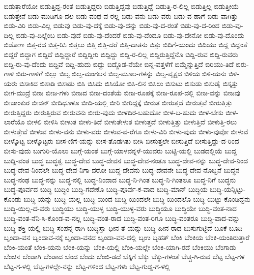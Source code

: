 ಬಿಡುತ್ತಾರೆಯೋ
ಬಿಡುತ್ತಿದ್ದ-ರಂತೆ
ಬಿಡುತ್ತಿದ್ದರು
ಬಿಡುತ್ತಿದ್ದವು
ಬಿಡುತ್ತಿದ್ದೆ
ಬಿಡುತ್ತಿ-ರ-ಲಿಲ್ಲ
ಬಿಡುತ್ತಿಲ್ಲ
ಬಿಡುತ್ತೀಯೆ
ಬಿಡುತ್ತೇನೆ
ಬಿಡು-ಮುಡಿಗೂ-ದಲ
ಬಿಡು-ವಂಥ-ವ-ರಲ್ಲ
ಬಿಡು-ವನು
ಬಿಡು-ವರು
ಬಿಡು-ವ-ಹಾಗೆ
ಬಿಡು-ವಾಗಿತ್ತು
ಬಿಡು-ವಿರಿ
ಬಿಡು-ವಿಲ್ಲ
ಬಿಡುವು
ಬಿಡು-ವು-ದಕ್ಕೆ
ಬಿಡು-ವು-ದನ್ನು
ಬಿಡು-ವು-ದ-ರಂತೆ
ಬಿಡು-ವು-ದ-ರಿಂದ
ಬಿಡು-ವು-ದಿಲ್ಲ
ಬಿಡು-ವು-ದಿಲ್ಲೆಂಬ
ಬಿಡು-ವುದೆ
ಬಿಡು-ವು-ದೆಂದರೆ
ಬಿಡು-ವು-ದೆಂದೂ
ಬಿಡು-ವು-ದೇನೋ
ಬಿಡು-ವು-ದೊಂದು
ಬಿಡೋಣ
ಬಿತ್ತ-ರದ
ಬಿತ್ತ-ರಿಸಿ
ಬಿತ್ತಲು
ಬಿತ್ತಿ
ಬಿತ್ತಿ-ದರೆ
ಬಿತ್ತಿ-ದಾತನು
ಬಿತ್ತು
ಬಿದಿಗೆ-ಯಂದು
ಬಿದಿಯು
ಬಿದ್ದ
ಬಿದ್ದಂತೆ
ಬಿದ್ದರೆ
ಬಿದ್ದಾಗ
ಬಿದ್ದಿದೆ
ಬಿದ್ದಿದ್ದಾರೆ
ಬಿದ್ದಿದ್ದೀರಿ
ಬಿದ್ದಿದ್ದು
ಬಿದ್ದಿ-ರ-ಲಿಲ್ಲ
ಬಿದ್ದಿರುತ್ತಿದ್ದೆನೊ
ಬಿದ್ದಿ-ರುವ
ಬಿದ್ದಿ-ರುವರು
ಬಿದ್ದಿ-ರು-ವು-ದೆಂದು
ಬಿದ್ದಿವೆ
ಬಿದ್ದಿ-ಹುದು
ಬಿದ್ದು
ಬಿದ್ದೊಡ-ನೆಯೇ
ಬಿನ್ನ-ವತ್ತಳೆಗೆ
ಬಿಮ್ಮೆನ್ನುತ್ತಿದೆ
ಬಿರಿಯು-ತಿದೆ
ಬಿರು-ಗಾಳಿ
ಬಿರು-ಗಾಳಿಗೆ
ಬಿಲ್ಲು
ಬಿಲ್ವ
ಬಿಲ್ವ-ಮಂಗಲನ
ಬಿಲ್ವ-ಮೂಲ-ಗಳನ್ನು
ಬಿಲ್ವ-ವೃಕ್ಷದ
ಬಿಳಿಯ
ಬಿಳಿ-ಯನು
ಬಿಳಿ-ಯರು
ಬಿಸಾಕಿದ
ಬಿಸಾಡಿ
ಬಿಸಾಡು
ಬಿಸಿ
ಬಿಸಿದು
ಬಿಸಿಯೋ
ಬಿಸಿ-ಲಿನ
ಬಿಸಿಲು
ಬಿಸುಟು
ಬಿಸುಡು
ಬಿಸುಡೈ
ಬಿಸ್ಕತ್ತು
ಬೀಗ-ಮುದ್ರೆ
ಬೀಜ
ಬೀಜ-ಗಳು
ಬೀಜದ
ಬೀಜ-ದಂತೆಯೆ
ಬೀಜ-ರೂಪಕ್ಕೆ
ಬೀಜ-ರೂಪ-ದಲ್ಲಿ
ಬೀಜ-ವನ್ನು
ಬೀಜವು
ಬೀಜಾಂಕುರ
ಬೀಡನ್
ಬೀದಿಧೂಳೂ
ಬೀದಿ-ಯಲ್ಲಿ
ಬೀರಿ
ಬೀರಿದ್ದಕ್ಕೆ
ಬೀರುತ
ಬೀರುತ್ತದೆ
ಬೀರುತ್ತವೆ
ಬೀರುತ್ತಿತ್ತು
ಬೀರುತ್ತಿದ್ದರು
ಬೀರುತ್ತಿರುವ
ಬೀರುವನು
ಬೀರು-ವುದು
ಬೀಳದಿರ-ಬಹುದೋ
ಬೀಳ-ಬ-ಹುದು
ಬೀಳ-ಬೇಕು
ಬೀಳ-ಲಾರೆಯೊ
ಬೀಳಲಿ
ಬೀಳಿಸಿ
ಬೀಳುತ
ಬೀಳು-ತಿದೆ
ಬೀಳುತೇಳುತ
ಬೀಳುತ್ತದೆ
ಬೀಳುತ್ತಿತ್ತು
ಬೀಳುತ್ತಿದೆ
ಬೀಳುತ್ತಿ-ರಲು
ಬೀಳುತ್ತೇವೆ
ಬೀಳುವ
ಬೀಳು-ವನು
ಬೀಳು-ವರು
ಬೀಳುವ-ವ-ರೆಗೂ
ಬೀಳು-ವಿರಿ
ಬೀಳು-ವುದು
ಬೀಳು-ವುವೋ
ಬೀಳುವೆ
ಬೀಳ್ಕೊಟ್ಟ
ಬೀಳ್ಕೊಟ್ಟರು
ಬೀಸ-ಣಿಗೆ-ಯನ್ನು
ಬೀಸ-ತೊಡಗಿತು
ಬೀಸಿ
ಬೀಸುತ್ತಲೇ
ಬೀಸುತ್ತಿದೆ
ಬೀಸುತ್ತಿದ್ದು-ದ-ರಿಂದ
ಬೀಸು-ವುದು
ಬುಗುರಿ-ಯೊಲು
ಬುಗ್ಗೆ-ಯಂತೆ
ಬುಗ್ಗೆ-ಯಾಳವನ್ನಳೆ-ಯುವರು
ಬುಟ್ಟಿ-ಯಲ್ಲಿ
ಬುಡದಲ್ಲಿಯೆ
ಬುದ್ದ
ಬುದ್ದಿ-ವಂತ
ಬುದ್ಧ
ಬುದ್ಧತ್ವ
ಬುದ್ಧ-ದೇವ
ಬುದ್ಧ-ದೇವನ
ಬುದ್ಧ-ದೇವ-ನಂತೂ
ಬುದ್ಧ-ದೇವ-ನನ್ನು
ಬುದ್ಧ-ದೇವ-ನಿಂದ
ಬುದ್ಧ-ದೇವ-ನಿಂದಲೇ
ಬುದ್ಧ-ದೇವ-ನಿಗಾ-ದರೋ
ಬುದ್ಧ-ದೇವನು
ಬುದ್ಧ-ದೇವನೇ
ಬುದ್ಧ-ದೇವ-ನೊಬ್ಬನೆ
ಬುದ್ಧನ
ಬುದ್ಧ-ನಂಥ
ಬುದ್ಧ-ನನ್ನು
ಬುದ್ಧ-ನಲ್ಲಿ
ಬುದ್ಧ-ನಿಂದಾದ
ಬುದ್ಧ-ನಿ-ಗಿಂತ
ಬುದ್ಧ-ನಿ-ಗಿಂತಲೂ
ಬುದ್ಧ-ನಿಗೆ
ಬುದ್ಧನು
ಬುದ್ಧ-ಪೂರ್ವದ
ಬುದ್ಧಿ
ಬುದ್ಧಿಂ
ಬುದ್ಧಿ-ಗದೇಕೊ
ಬುದ್ಧಿ-ಪೂರ್ವ-ಕ-ವಾದ
ಬುದ್ಧಿ-ಮಾನ್
ಬುದ್ಧಿಯ
ಬುದ್ಧಿ-ಯನ್ನಿಟ್ಟು-ಕೊಂಡು
ಬುದ್ಧಿ-ಯನ್ನು
ಬುದ್ಧಿ-ಯಲ್ಲ
ಬುದ್ಧಿ-ಯಿಂದ
ಬುದ್ಧಿ-ಯಿಂದಲೇ
ಬುದ್ಧಿ-ಯಿಂದಲೊ
ಬುದ್ಧಿ-ಯಿಟ್ಟು-ಕೊಂಡಿದ್ದನು
ಬುದ್ಧಿ-ಯಿಲ್ಲ-ದ-ವರು
ಬುದ್ಧಿಯು
ಬುದ್ಧಿ-ಯುಳ್ಳ
ಬುದ್ಧಿ-ಯುಳ್ಳ-ವರು
ಬುದ್ಧಿಯೂ
ಬುದ್ಧಿಯೇ
ಬುದ್ಧಿ-ವಂತ-ನಾದ
ಬುದ್ಧಿ-ವಂತ-ನೆನಿ-ಸಿ-ಕೊಂಡ-ವ-ನಲ್ಲ
ಬುದ್ಧಿ-ವಂತ-ರಾದ
ಬುದ್ಧಿ-ವಂತ-ರಿಗೂ
ಬುದ್ಧಿ-ವಂತರೂ
ಬುದ್ಧಿ-ವಾದ-ವನ್ನು
ಬುದ್ಧಿ-ಶಕ್ತಿ-ಯಲ್ಲಿ
ಬುದ್ಧಿ-ಸಂಪನ್ನ-ರಾಗಿ
ಬುದ್ಧಿಸ್ವಾ-ಧೀನ-ತೆ-ಯನ್ನು
ಬುದ್ಧಿ-ಹೀನ-ರಾದ
ಬುಸುಗುಟ್ಟಿದೆ
ಬೂಕೆ
ಬೂದಿ
ಬೃಂದಾ-ವನ
ಬೃಂದಾವ-ನಕ್ಕೆ
ಬೃಂದಾ-ವನದ
ಬೃಂದಾ-ವನ-ದಲ್ಲಿ
ಬೃಉ
ಬೃಹತ್
ಬೆಂಕಿ
ಬೆಂಕಿಯ
ಬೆಂಕಿ-ಯಂತಿರುತ್ತಾರೆ
ಬೆಂಕಿ-ಯಂತೆ
ಬೆಂಕಿ-ಯನು
ಬೆಂಕಿ-ಯನ್ನು
ಬೆಂಕಿ-ಯಲ್ಲಿ
ಬೆಂಕಿ-ಯಲ್ಲೇ
ಬೆಂಕಿ-ಯಾಗಿ-ರದೆ
ಬೆಂಕಿಯು
ಬೆಂಗಾಡು
ಬೆಂಚಿನ
ಬೆಂಡಾಗಿ
ಬೆಂಡಾದ
ಬೆಂದ
ಬೆಂದು
ಬೆಂಬಿ-ಡದೆ
ಬೆಕ್ಕಿಗೆ
ಬೆಕ್ಕು
ಬೆಕ್ಕು-ಗಳಂತೆ
ಬೆಚ್ಚ-ಗಿ-ರುವ
ಬೆಟ್ಟ
ಬೆಟ್ಟ-ಗಳ
ಬೆಟ್ಟ-ಗ-ಳಲ್ಲಿ
ಬೆಟ್ಟ-ಗಳಲ್ಲೇ-ನನ್ನು
ಬೆಟ್ಟ-ಗಳಿಂದ
ಬೆಟ್ಟ-ಗಳು
ಬೆಟ್ಟ-ಗುಡ್ಡ-ಗ-ಳಲ್ಲಿ
